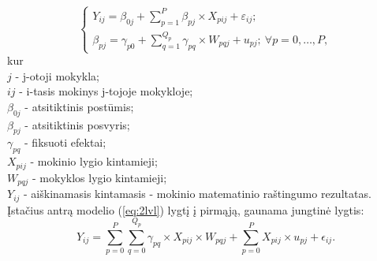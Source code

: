 \documentclass[11pt,a4paper]{article}
\begin{document}
\begin{equation} \label{eq:2lvl}
\left\{
\begin{array}{l}
Y_{ij} = \beta_{0j}+\sum^P_{p = 1} \beta_{pj}\times X_{pij}+\varepsilon_{ij}; \\
\beta_{pj} = \gamma_{p0} + \sum^{Q_p}_{q=1}\gamma_{pq}\times W_{pqj}+u_{pj};\ \forall p = 0 , \dots, P,
\end{array} \right.
\end{equation}
kur\\
$j$ - j-otoji mokykla;\\
$ij$ - i-tasis mokinys j-tojoje mokykloje;\\
$\beta_{0j}$ - atsitiktinis postūmis;\\
$\beta_{pj}$ - atsitiktinis posvyris;\\
$\gamma_{pq}$ - fiksuoti efektai;\\
$X_{pij}$ - mokinio lygio kintamieji;\\
$W_{pqj}$ - mokyklos lygio kintamieji;\\
$Y_{ij}$ - aiškinamasis kintamasis - mokinio matematinio raštingumo rezultatas.\\

\indent Įstačius antrą modelio (\ref{eq:2lvl}) lygtį į pirmąją, gaunama jungtinė lygtis:
\begin{equation*} \label{eq:2lvljung}
Y_{ij} =\sum^P_{p = 0} \sum^{Q_p}_{q=0}\gamma_{pq}\times X_{pij}\times W_{pqj}+\sum^P_{p = 0} X_{pij}\times u_{pj}+\epsilon_{ij}.
\end{equation*}
\end{document}
